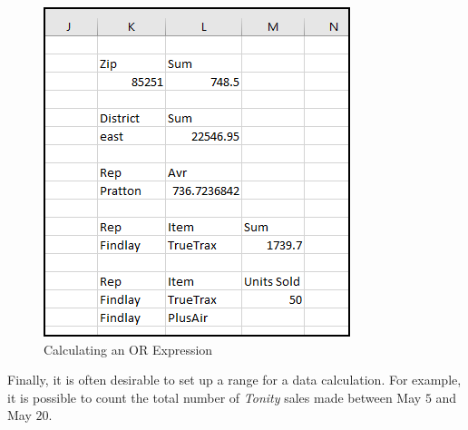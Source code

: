 \begin{enumerate}
	\begin{figure}[H]
		\centering
		\includegraphics[width=\maxwidth{.75\linewidth}]{gfx/ch09_fig23}
		\caption{Calculating an OR Expression}
		\label{09:fig23}
	\end{figure}
\end{enumerate}

Finally, it is often desirable to set up a range for a data calculation. For example, it is possible to count the total number of \textit{Tonity} sales made between May $ 5 $ and May $ 20 $.


